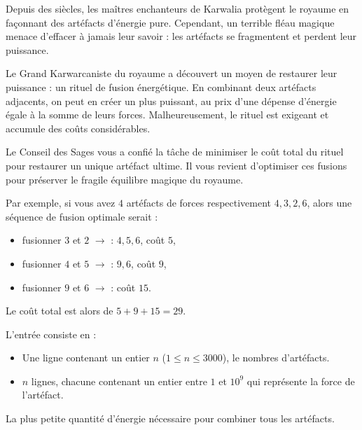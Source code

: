 \problemname{\problemyamlname{}}


Depuis des siècles, les maîtres enchanteurs de Karwalia protègent le royaume en façonnant des artéfacts d'énergie pure. Cependant, un terrible fléau magique menace d'effacer à jamais leur savoir : les artéfacts se fragmentent et perdent leur puissance.

Le Grand Karwarcaniste du royaume a découvert un moyen de restaurer leur puissance : un rituel de fusion énergétique. En combinant deux artéfacts adjacents, on peut en créer un plus puissant, au prix d'une dépense d'énergie égale à la somme de leurs forces. Malheureusement, le rituel est exigeant et accumule des coûts considérables.

Le Conseil des Sages vous a confié la tâche de minimiser le coût total du rituel pour restaurer un unique artéfact ultime. Il vous revient d'optimiser ces fusions pour préserver le fragile équilibre magique du royaume.

Par exemple, si vous avez $4$ artéfacts de forces respectivement $4, 3, 2, 6$, alors une séquence de fusion optimale serait :
\begin{itemize}
    \item fusionner $3$ et $2$ $\rightarrow$ : $4, 5, 6$, coût $5$,
    \item fusionner $4$ et $5$ $\rightarrow$ : $9, 6$, coût $9$,
    \item fusionner $9$ et $6$ $\rightarrow$ : coût $15$.
\end{itemize}
Le coût total est alors de $5 + 9 + 15 = 29$.

\begin{Input}
    L'entrée consiste en :
    \begin{itemize}
        \item Une ligne contenant un entier $n$ ($1 \leq n \leq 3000$), le nombres d'artéfacts.
        \item $n$ lignes, chacune contenant un entier entre $1$ et $10^{9}$ qui représente la force de l'artéfact.
    \end{itemize}
\end{Input}

\begin{Output}
    La plus petite quantité d'énergie nécessaire pour combiner tous les artéfacts.
\end{Output}
